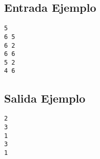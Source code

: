 \begin{multicols}{2}

\subsection*{Entrada Ejemplo}

\begin{verbatim}
5
6 5
6 2
6 6
5 2
4 6
\end{verbatim}

\columnbreak

\subsection*{Salida Ejemplo}

\begin{verbatim}
2
3
1
3
1
\end{verbatim}

\end{multicols}